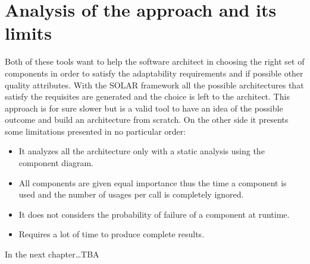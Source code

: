 \section{Analysis of the approach and its limits}
Both of these tools want to help the software architect in choosing the right set of components in order to satisfy the adaptability requirements and if possible other quality attributes. With the SOLAR framework all the possible architectures that satisfy the requisites are generated and the choice is left to the architect. This approach is for sure slower but is a valid tool to have an idea of the possible outcome and build an architecture from scratch. On the other side it presents some limitations presented in no particular order:
\begin{itemize}
	\item It analyzes all the architecture only with a static analysis using the component diagram.
	\item All components are given equal importance thus the time a component is used and the number of usages per call is completely ignored.
	\item It does not considers the probability of failure of a component at runtime.
	\item Requires a lot of time to produce complete results.
\end{itemize}
In the next chapter\dots \color{red}TBA